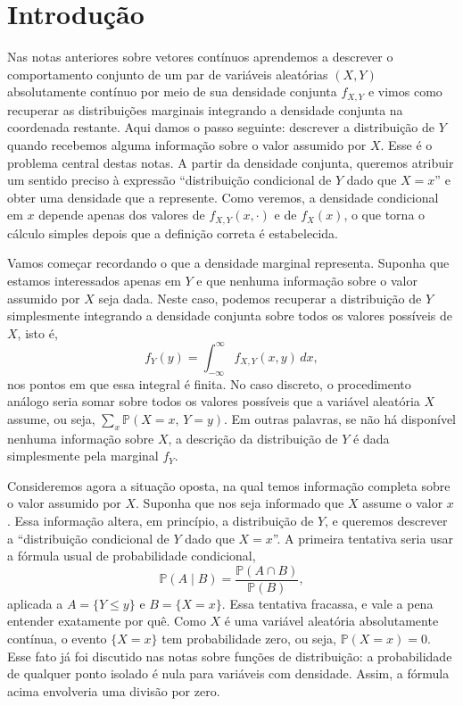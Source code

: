 \documentclass[12pt,portuguese]{article}
\theoremstyle{definition}
\theoremstyle{plainexercise}
\theoremstyle{starredexercise}
\theoremstyle{definition}
\begin{document}
\section{Introdução}\label{sec:introducao}

Nas notas anteriores sobre vetores contínuos aprendemos a descrever o comportamento
conjunto de um par de variáveis aleatórias $(X,Y)$ absolutamente contínuo por meio de sua
densidade conjunta $f_{X,Y}$ e vimos como recuperar as distribuições marginais integrando
a densidade conjunta na coordenada restante. Aqui damos o passo seguinte: descrever a
distribuição de $Y$ quando recebemos alguma informação sobre o valor assumido por $X$.
Esse é o problema central destas notas. A partir da densidade conjunta, queremos atribuir
um sentido preciso à expressão ``distribuição condicional de $Y$ dado que $X = x$'' e
obter uma densidade que a represente. Como veremos, a densidade condicional em $x$
depende apenas dos valores de $f_{X,Y}(x,\cdot)$ e de $f_X(x)$, o que torna o cálculo
simples depois que a definição correta é estabelecida.

Vamos começar recordando o que a densidade marginal representa. Suponha que estamos interessados 
apenas em $Y$ e que nenhuma informação sobre o valor assumido por $X$ seja dada. Neste caso,
podemos recuperar a distribuição de $Y$ simplesmente integrando a densidade conjunta sobre todos 
os valores possíveis de $X$, isto é,
\[
  f_Y(y) = \int_{-\infty}^{\infty} f_{X,Y}(x,y)\,dx,
\]
nos pontos em que essa integral é finita. No caso discreto, o procedimento análogo seria somar
sobre todos os valores possíveis que a variável aleatória $X$ assume, ou seja,
$\sum_x \mathbb{P}(X = x,\, Y = y)$.
Em outras palavras, se não há disponível nenhuma informação sobre $X$, 
a descrição da distribuição de $Y$ é dada simplesmente pela marginal
$f_Y$.

\bigskip 
Consideremos agora a situação oposta, na qual temos informação completa sobre o valor
assumido por $X$. Suponha que nos seja informado que $X$ assume o valor $x$. Essa
informação altera, em princípio, a distribuição de $Y$, e queremos descrever a
``distribuição condicional de $Y$ dado que $X = x$''. A primeira tentativa seria usar a
fórmula usual de probabilidade condicional,
\[
  \mathbb{P}(A \mid B) = \frac{\mathbb{P}(A \cap B)}{\mathbb{P}(B)},
\]
aplicada a $A = \{Y \leqslant y\}$ e $B = \{X = x\}$. Essa tentativa fracassa, e vale a
pena entender exatamente por quê. Como $X$ é uma variável aleatória absolutamente
contínua, o evento $\{X = x\}$ tem probabilidade zero, ou seja, $\mathbb{P}(X = x) = 0$.
Esse fato já foi discutido nas notas sobre funções de distribuição: a probabilidade de
qualquer ponto isolado é nula para variáveis com densidade. Assim, a fórmula acima
envolveria uma divisão por zero.
\end{document}
